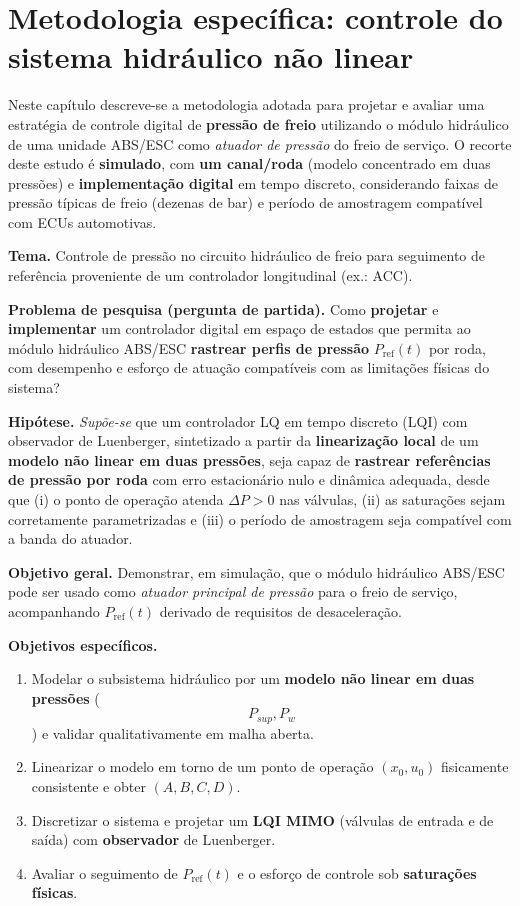 \chapter{Metodologia específica: controle do sistema hidráulico não linear}
\label{cap:controle}

Neste capítulo descreve-se a metodologia adotada para projetar e avaliar uma estratégia de controle digital de \textbf{pressão de freio} utilizando o módulo hidráulico de uma unidade ABS/ESC como \emph{atuador de pressão} do freio de serviço. O recorte deste estudo é \textbf{simulado}, com \textbf{um canal/roda} (modelo concentrado em duas pressões) e \textbf{implementação digital} em tempo discreto, considerando faixas de pressão típicas de freio (dezenas de bar) e período de amostragem compatível com ECUs automotivas.

\textbf{Tema.} Controle de pressão no circuito hidráulico de freio para seguimento de referência proveniente de um controlador longitudinal (ex.: ACC).

\textbf{Problema de pesquisa (pergunta de partida).}
Como \textbf{projetar} e \textbf{implementar} um controlador digital em espaço de estados que permita ao módulo hidráulico ABS/ESC \textbf{rastrear perfis de pressão} $P_{\mathrm{ref}}(t)$ por roda, com desempenho e esforço de atuação compatíveis com as limitações físicas do sistema?

\textbf{Hipótese.}
\emph{Supõe-se} que um controlador LQ em tempo discreto (LQI) com observador de Luenberger, sintetizado a partir da \textbf{linearização local} de um \textbf{modelo não linear em duas pressões}, seja capaz de \textbf{rastrear referências de pressão por roda} com erro estacionário nulo e dinâmica adequada, desde que (i) o ponto de operação atenda $\Delta P>0$ nas válvulas, (ii) as saturações sejam corretamente parametrizadas e (iii) o período de amostragem seja compatível com a banda do atuador.

\textbf{Objetivo geral.}
Demonstrar, em simulação, que o módulo hidráulico ABS/ESC pode ser usado como \emph{atuador principal de pressão} para o freio de serviço, acompanhando $P_{\mathrm{ref}}(t)$ derivado de requisitos de desaceleração.

\textbf{Objetivos específicos.}
\begin{enumerate}
    \item Modelar o subsistema hidráulico por um \textbf{modelo não linear em duas pressões} ($$P_{sup},P_w$$) e validar qualitativamente em malha aberta.
    \item Linearizar o modelo em torno de um ponto de operação \((x_0,u_0)\) fisicamente consistente e obter \((A,B,C,D)\).
    \item Discretizar o sistema e projetar um \textbf{LQI MIMO} (válvulas de entrada e de saída) com \textbf{observador} de Luenberger.
    \item Avaliar o seguimento de $P_{\mathrm{ref}}(t)$ e o esforço de controle sob \textbf{saturações físicas}.
\end{enumerate}

